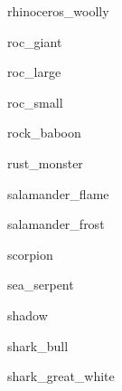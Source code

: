 \documentclass[letterpaper,serif]{module}
\begin{document}
\begin{newmonster}{rhinoceros_woolly}\end{newmonster}

\begin{newmonster}{roc_giant}\end{newmonster}

\begin{newmonster}{roc_large}\end{newmonster}

\begin{newmonster}{roc_small}\end{newmonster}

\begin{newmonster}{rock_baboon}\end{newmonster}

\begin{newmonster}{rust_monster}\end{newmonster}

\begin{newmonster}{salamander_flame}\end{newmonster}

\begin{newmonster}{salamander_frost}\end{newmonster}

\begin{newmonster}{scorpion}\end{newmonster}

\begin{newmonster}{sea_serpent}\end{newmonster}

\begin{newmonster}{shadow}\end{newmonster}

\begin{newmonster}{shark_bull}\end{newmonster}

\begin{newmonster}{shark_great_white}\end{newmonster}
\end{document}
